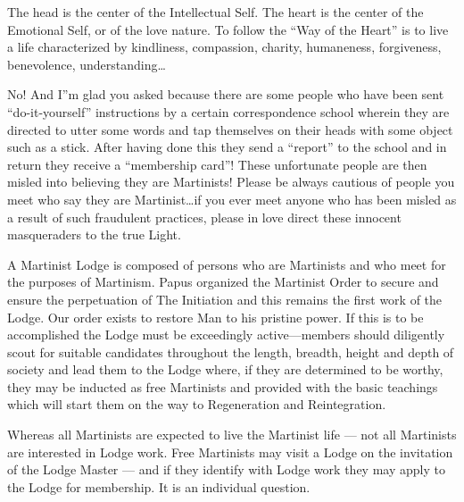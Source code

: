 
The head is the center of the Intellectual Self. The heart is the center of the Emotional Self, or of the love nature. To follow the ``Way of the Heart'' is to live a life characterized by kindliness, compassion, charity, humaneness, forgiveness, benevolence, understanding\ldots


No! And I''m glad you asked because there are some people who have been sent ``do-it-yourself'' instructions by a certain correspondence school wherein they are directed to utter some words and tap themselves on their heads with some object such as a stick. After having done this they send a ``report'' to the school and in return they receive a ``membership card''! These unfortunate people are then misled into believing they are Martinists! Please be always cautious of people you meet who say they are Martinist…if you ever meet anyone who has been misled as a result of such fraudulent practices, please in love direct these innocent masqueraders to the true Light. 


A Martinist Lodge is composed of persons who are Martinists and who meet for the purposes of Martinism. Papus organized the Martinist Order to secure and ensure the perpetuation of The Initiation and this remains the first work of the Lodge. Our order exists to restore Man to his pristine power. If this is to be accomplished the Lodge must be exceedingly active—members should diligently scout for suitable candidates throughout the length, breadth, height and depth of society and lead them to the Lodge where, if they are determined to be worthy, they may be inducted as free Martinists and provided with the basic teachings which will start them on the way to Regeneration and Reintegration. 


Whereas all Martinists are expected to live the Martinist life --- not all Martinists are interested in Lodge work. Free Martinists may visit a Lodge on the invitation of the Lodge Master --- and if they identify with Lodge work they may apply to the Lodge for membership. It is an individual question.



